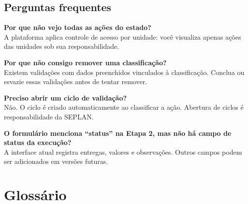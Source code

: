 \documentclass[11pt,a4paper]{article}
\begin{document}
\subsection{Perguntas frequentes}

\textbf{Por que não vejo todas as ações do estado?}\\
A plataforma aplica controle de acesso por unidade: você visualiza apenas ações das unidades sob sua responsabilidade.

\textbf{Por que não consigo remover uma classificação?}\\
Existem validações com dados preenchidos vinculados à classificação. Conclua ou esvazie essas validações antes de tentar remover.

\textbf{Preciso abrir um ciclo de validação?}\\
Não. O ciclo é criado automaticamente ao classificar a ação. Abertura de ciclos é responsabilidade da SEPLAN.

\textbf{O formulário menciona ``status'' na Etapa 2, mas não há campo de status da execução?}\\
A interface atual registra entregas, valores e observações. Outros campos podem ser adicionados em versões futuras.

\section{Glossário}
\end{document}
